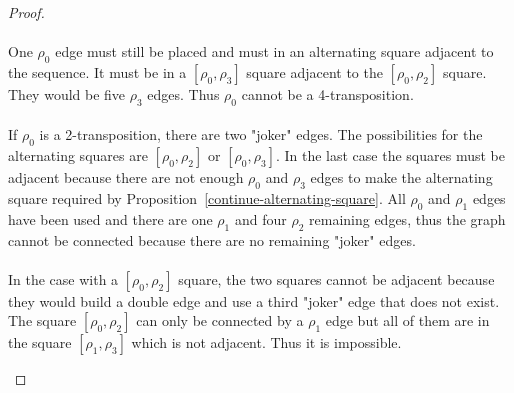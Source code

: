 \begin{proof}
\begin{figure}[H]
\begin{center}
\begin{tikzpicture}[scale=.8]
      \end{tikzpicture}
      \caption{}
    \end{center}
  \end{figure}

  \paragraph{}
  One $\rho_0$ edge must still be placed and must in an alternating square adjacent to the sequence. It must be in a $[\rho_0, \rho_3]$ square adjacent to the $[\rho_0, \rho_2]$ square. They would be five $\rho_3$ edges. Thus $\rho_0$ cannot be a 4-transposition.

  \paragraph{}
  If $\rho_0$ is a 2-transposition, there are two "joker" edges. The possibilities for the alternating squares are $[\rho_0, \rho_2]$ or $[\rho_0, \rho_3]$. In the last case the squares must be adjacent because there are not enough $\rho_0$ and $\rho_3$ edges to make the alternating square required by Proposition~\ref{continue-alternating-square}. All $\rho_0$ and $\rho_1$ edges have been used and there are one $\rho_1$ and four $\rho_2$ remaining edges, thus the graph cannot be connected because there are no remaining "joker" edges.

  \paragraph{}
  In the case with a $[\rho_0, \rho_2]$ square, the two squares cannot be adjacent because they would build a double edge and use a third "joker" edge that does not exist. The square $[\rho_0, \rho_2]$ can only be connected by a $\rho_1$ edge but all of them are in the square $[\rho_1, \rho_3]$ which is not adjacent. Thus it is impossible.

  \begin{figure}[H]
    \begin{center}
\end{center}
\end{figure}
\end{proof}
